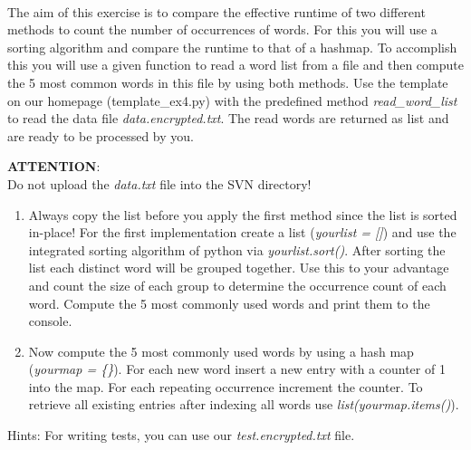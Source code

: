  \\
  The aim of this exercise is to compare the effective runtime of  two different methods to count the number of occurrences of words. 
  For this you will use a sorting algorithm and compare the runtime to that of a hashmap. 
  To accomplish this you will use a given function to read a word list from a file and then compute the 5 most common words in this file by using both methods.
  Use the template on our homepage (template\_ex4.py) with the predefined method \textit{read\_word\_list} to read the data file \textit{data.encrypted.txt}.
  The read words are returned as list and are ready to be processed by you.

 \textbf{ATTENTION}:\\
   Do not upload the \textit{data.txt} file into the SVN directory!
\begin{enumerate}
  \item
    Always copy the list before you apply the first method since the list is sorted in-place!
    For the first implementation create a list (\textit{yourlist = []}) and use the integrated sorting algorithm of python via \textit{yourlist.sort()}.
    After sorting the list each distinct word will be grouped together.
    Use this to your advantage and count the size of each group to determine the occurrence count of each word.
    Compute the 5 most commonly used words and print them to the console.
  \item
    Now compute the 5 most commonly used words by using a hash map (\textit{yourmap = \{\}}).
    For each new word insert a new entry with a counter of 1 into the map.
    For each repeating occurrence increment the counter.
    To retrieve all existing entries after indexing all words use \textit{list(yourmap.items()}).
\end{enumerate}

Hints:
For writing tests, you can use our \textit{test.encrypted.txt} file.

